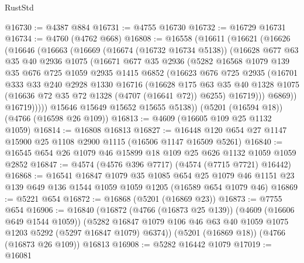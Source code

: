 \begin{lexlean}{RustStd}
\begin{coremodule}
@16730 := @4387 @884
@16731 := @4755 @16730
@16732 := @16729 @16731
@16734 := @4760 (@4762 @668)
@16808 := @16558
    (@16611
      (@16621
        (@16626
          (@16646
            (@16663
              (@16669
                (@16674 (@16732 @16734 @5138))
                (@16628
                  @677
                  @63
                  @35
                  @40
                  @2936
                  @1075
                  (@16671
                    @677
                    @35
                    @2936
                    (@5282
                      @16568
                      @1079
                      @139
                      @35
                      @676
                      @725
                      @1059
                      @2935
                      @1415
                      @6852
                      (@16623
                        @676
                        @725
                        @2935
                        (@16701
                          @333
                          @33
                          @240
                          @2928
                          @1330
                          @16716
                          (@16628
                            @175
                            @63
                            @35
                            @40
                            @1328
                            @1075
                            (@16636 @72 @35 @72 @1328 (@4707 (@16641 @72)) @6255)
                            @16719)))
                      @6869))
                  @16719)))))
        @15646
        @15649
        @15652
        @15655
        @5138))
    (@5201 (@16594 @18))
    (@4766 (@16598 @26 @109))
@16813 := @4609 (@16605 @109 @25 @1132 @1059)
@16814 := @16808 @16813
@16827 := @16448 @120 @654 @27 @1147 @15900 @25 @1108 @2900 @1115 (@16506 @1147 @16509 @5261)
@16840 := @16545 @654 @26 @1079 @46 @15899 @18 @109 @25 @626 @1132 @1059 @1059 @2852
@16847 := @4574 (@4576 @396 @7717) (@4574 (@7715 @7721) @16442)
@16868 := @16541
    @16847
    @1079
    @35
    @1085
    @654
    @25
    @1079
    @46
    @1151
    @23
    @139
    @649
    @136
    @1544
    @1059
    @1059
    @1205
    (@16589 @654 @1079 @46)
@16869 := @5221 @654
@16872 := @16868 (@5201 (@16869 @23))
@16873 := @7755 @654
@16906 := @16840
    (@16872
      (@4766 (@16873 @25 @139))
      (@4609 (@16606 @649 @1544 @1059))
      (@5282 @16847 @1079 @106 @46 @63 @40 @1059 @1075 @1203 @5292 (@5297 @16847 @1079) @6374))
    (@5201 (@16869 @18))
    (@4766 (@16873 @26 @109))
    @16813
@16908 := @5282 @16442 @1079
@17019 := @16081

\end{coremodule}
\end{lexlean}
